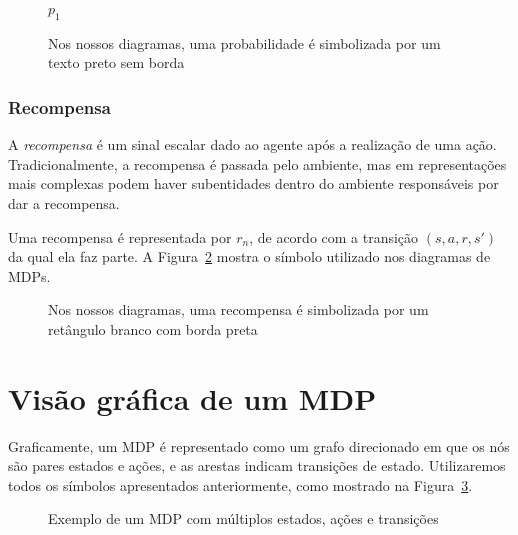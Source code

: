 \documentclass{article}
\begin{document}
                \begin{figure}[ht]
                    \centering
                    $p_1$\\
                    \caption{Nos nossos diagramas, uma probabilidade é simbolizada por um texto preto sem borda}
                    \label{diag:prob-label}
                \end{figure}
                
            \subsubsection{Recompensa}
            
                A \emph{recompensa} é um sinal escalar dado ao agente após a realização de uma ação. Tradicionalmente, a recompensa é passada pelo ambiente, mas em representações mais complexas podem haver subentidades dentro do ambiente responsáveis por dar a recompensa. 

                Uma recompensa é representada por $r_n$, de acordo com a transição $(s, a, r, s')$ da qual ela faz parte. A Figura~\ref{diag:reward-label} mostra o símbolo utilizado nos diagramas de MDPs.
        
                \begin{figure}[ht]
                    \centering
                    \caption{Nos nossos diagramas, uma recompensa é simbolizada por um retângulo branco com borda preta}
                    \label{diag:reward-label}
                \end{figure}
        
    \section{Visão gráfica de um MDP}
    
        Graficamente, um MDP é representado como um grafo direcionado em que os nós são pares estados e ações, e as arestas indicam transições de estado. Utilizaremos todos os símbolos apresentados anteriormente, como mostrado na Figura~\ref{diag:mdp-big}.
    
        \begin{figure}[ht]
            \centering
            \mdpbig
            \caption{Exemplo de um MDP com múltiplos estados, ações e transições}
            \label{diag:mdp-big}
        \end{figure}
        
\end{document}

